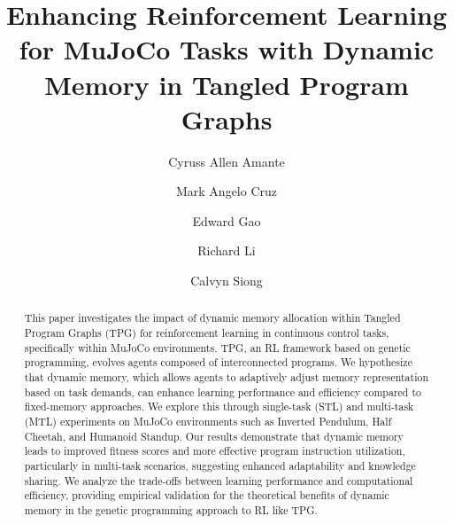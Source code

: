 \documentclass[sigconf]{acmart}
\begin{document}
\title[Dynamic Memory in Tangled Program Graphs]{Enhancing Reinforcement Learning for MuJoCo Tasks with Dynamic Memory in Tangled Program Graphs}

\author{Cyruss Allen Amante}

\author{Mark Angelo Cruz}

\author{Edward Gao}

\author{Richard Li}

\author{Calvyn Siong}



\begin{abstract}
  This paper investigates the impact of dynamic memory allocation within 
  Tangled Program Graphs (TPG) for reinforcement learning in continuous control 
  tasks, specifically within MuJoCo environments. TPG, an RL framework based on 
  genetic programming, evolves agents composed of interconnected programs. 
  We hypothesize that dynamic memory, which allows agents to adaptively adjust 
  memory representation based on task demands, can enhance learning performance 
  and efficiency compared to fixed-memory approaches. We explore this through 
  single-task (STL) and multi-task (MTL) experiments on MuJoCo environments such as Inverted 
  Pendulum, Half Cheetah, and Humanoid Standup. Our results demonstrate that dynamic 
  memory leads to improved fitness scores and more effective program instruction utilization, 
  particularly in multi-task scenarios, suggesting enhanced adaptability and knowledge sharing. 
  We analyze the trade-offs between learning performance and computational efficiency, 
  providing empirical validation for the theoretical benefits of dynamic memory in 
  the genetic programming approach to RL like TPG.
\end{abstract}
\end{document}
